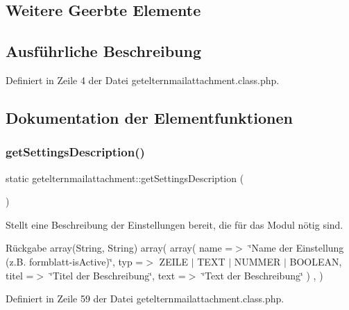 \subsection*{Weitere Geerbte Elemente}


\subsection{Ausführliche Beschreibung}


Definiert in Zeile 4 der Datei getelternmailattachment.\+class.\+php.



\subsection{Dokumentation der Elementfunktionen}
\mbox{\label{classgetelternmailattachment_ae81c9e4c7a2ce123cd24500da563fbaa}} 
\subsubsection{\texorpdfstring{get\+Settings\+Description()}{getSettingsDescription()}}
{\footnotesize\ttfamily static getelternmailattachment\+::get\+Settings\+Description (\begin{DoxyParamCaption}{ }\end{DoxyParamCaption})\hspace{0.3cm}{\ttfamily [static]}}

Stellt eine Beschreibung der Einstellungen bereit, die für das Modul nötig sind. \begin{DoxyReturn}{Rückgabe}
array(\+String, String) array( array( \textquotesingle{}name\textquotesingle{} =$>$ \char`\"{}\+Name der Einstellung (z.\+B. formblatt-\/is\+Active)\char`\"{}, \textquotesingle{}typ\textquotesingle{} =$>$ Z\+E\+I\+LE $\vert$ T\+E\+XT $\vert$ N\+U\+M\+M\+ER $\vert$ B\+O\+O\+L\+E\+AN, \textquotesingle{}titel\textquotesingle{} =$>$ \char`\"{}\+Titel der Beschreibung\char`\"{}, \textquotesingle{}text\textquotesingle{} =$>$ \char`\"{}\+Text der Beschreibung\char`\"{} ) , ) 
\end{DoxyReturn}


Definiert in Zeile 59 der Datei getelternmailattachment.\+class.\+php.

